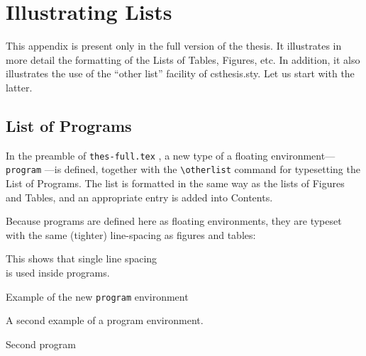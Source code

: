 
%
%

\chapter{Illustrating Lists}\label{app:lists}

This appendix is present only in the full version of the thesis. It
illustrates in more detail the formatting of the Lists of Tables,%
 Figures, etc. In
addition, it also illustrates the use of the ``other list'' facility
of \textsf{csthesis.sty}.
Let us start with the latter.

\section{List of Programs}

In the preamble of \texttt{thes-full.tex}%
, a new type of a floating
environment---\texttt{program}%
---is defined,
together with the \verb+\otherlist+%
 command for
typesetting the List of Programs. The list is formatted in the same
way as the lists of Figures and Tables, and an appropriate entry is
added into Contents.

Because programs are defined here as floating environments, they are
typeset with the same (tighter) line-spacing%
 as figures and tables:

\begin{program}[htbp]
  \begin{center}
    This shows that single line spacing\\
    is used inside programs.
    \caption{Example of the new \texttt{program} environment\label{prog1}}
  \end{center}
\end{program}
%
\vspace*{-.3in}
\begin{program}[htbp]
  \begin{center}
    A second example of a program environment.
    \caption{Second program\label{prog2}}
  \end{center}
\end{program}

